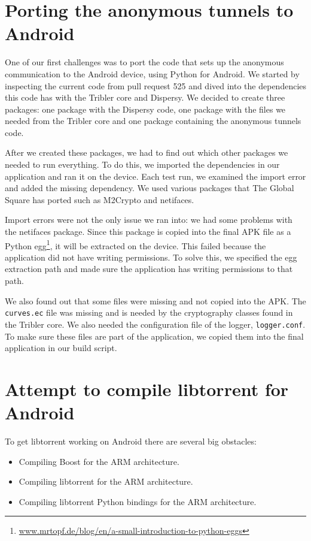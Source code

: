 	\section{Porting the anonymous tunnels to Android}
		One of our first challenges was to port the code that sets up the anonymous communication to the Android device, using Python for Android. We started by inspecting the current code from pull request 525 and dived into the dependencies this code has with the Tribler core and Dispersy. We decided to create three packages: one package with the Dispersy code, one package with the files we needed from the Tribler core and one package containing the anonymous tunnels code.
		
		After we created these packages, we had to find out which other packages we needed to run everything. To do this, we imported the dependencies in our application and ran it on the device. Each test run, we examined the import error and added the missing dependency. We used various packages that The Global Square has ported such as M2Crypto and netifaces.
		
		Import errors were not the only issue we ran into: we had some problems with the netifaces package. Since this package is copied into the final APK file as a Python egg\footnote{\href{http://mrtopf.de/blog/en/a-small-introduction-to-python-eggs/}{www.mrtopf.de/blog/en/a-small-introduction-to-python-eggs}}, it will be extracted on the device. This failed because the application did not have writing permissions. To solve this, we specified the egg extraction path and made sure the application has writing permissions to that path.
		
		We also found out that some files were missing and not copied into the APK. The \texttt{curves.ec} file was missing and is needed by the cryptography classes found in the Tribler core. We also needed the configuration file of the logger, \texttt{logger.conf}. To make sure these files are part of the application, we copied them into the final application in our build script.
		
	\section{Attempt to compile libtorrent for Android}
		To get libtorrent working on Android there are several big obstacles:
		\begin{itemize}
			\item Compiling Boost for the ARM architecture.
			\item Compiling libtorrent for the ARM architecture.
			\item Compiling libtorrent Python bindings for the ARM architecture.
		\end{itemize}
		

